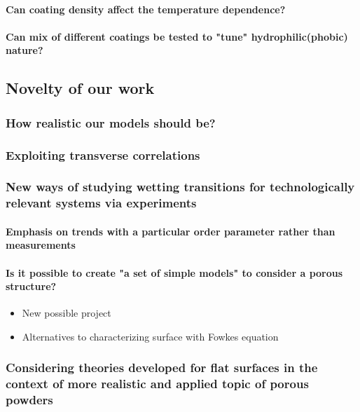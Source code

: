 \documentclass[a4paper,12pt,single,pdftex]{scrartcl}
\begin{document}
\label{ID_838488932}\paragraph{Can coating density affect the temperature dependence?}

\label{ID_1401479645}\paragraph{Can mix of different coatings be tested to "tune" hydrophilic(phobic) nature?}

\label{ID_1979164963}\subsection{Novelty of our work}

\label{ID_1997632539}\subsubsection{How realistic our models should be?}

\label{ID_625214648}\subsubsection{Exploiting transverse correlations}

\label{ID_1607535616}\subsubsection{New ways of studying wetting transitions for technologically relevant systems via experiments}

\label{ID_825518109}\paragraph{Emphasis on trends with a particular order parameter rather than measurements}

\label{ID_1028951925}\paragraph{Is it possible to create "a set of simple models" to consider a porous structure?}

\begin{itemize}
\label{ID_1602351942}\item New possible project
\label{ID_714004449}\item Alternatives to characterizing surface with Fowkes equation
\end{itemize}
\label{ID_1602351942}\label{ID_714004449}\label{ID_30899692}\subsubsection{Considering theories developed for flat surfaces in the context of more realistic and applied topic of porous powders}
\end{document}
